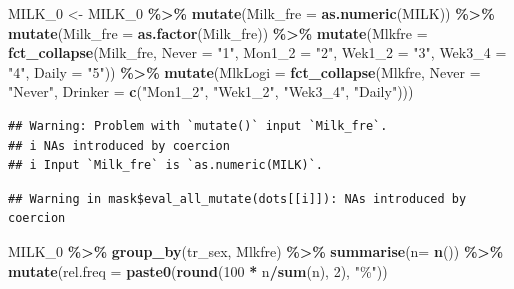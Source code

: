 \documentclass[
]{article}
\newenvironment{Shaded}{\begin{snugshade}}{\end{snugshade}}
\newcommand{\DataTypeTok}[1]{\textcolor[rgb]{0.13,0.29,0.53}{#1}}
\newcommand{\DecValTok}[1]{\textcolor[rgb]{0.00,0.00,0.81}{#1}}
\newcommand{\KeywordTok}[1]{\textcolor[rgb]{0.13,0.29,0.53}{\textbf{#1}}}
\newcommand{\NormalTok}[1]{#1}
\newcommand{\OperatorTok}[1]{\textcolor[rgb]{0.81,0.36,0.00}{\textbf{#1}}}
\newcommand{\StringTok}[1]{\textcolor[rgb]{0.31,0.60,0.02}{#1}}
\begin{document}
\begin{Shaded}
\begin{Highlighting}[]
\NormalTok{MILK\_}\DecValTok{0}\NormalTok{ \textless{}{-}}\StringTok{ }\NormalTok{MILK\_}\DecValTok{0} \OperatorTok{\%\textgreater{}\%}\StringTok{ }
\StringTok{  }\KeywordTok{mutate}\NormalTok{(}\DataTypeTok{Milk\_fre =} \KeywordTok{as.numeric}\NormalTok{(MILK)) }\OperatorTok{\%\textgreater{}\%}\StringTok{ }
\StringTok{  }\KeywordTok{mutate}\NormalTok{(}\DataTypeTok{Milk\_fre =} \KeywordTok{as.factor}\NormalTok{(Milk\_fre)) }\OperatorTok{\%\textgreater{}\%}\StringTok{ }
\StringTok{  }\KeywordTok{mutate}\NormalTok{(}\DataTypeTok{Mlkfre =} \KeywordTok{fct\_collapse}\NormalTok{(Milk\_fre,}
                               \DataTypeTok{Never =} \StringTok{"1"}\NormalTok{,}
                               \DataTypeTok{Mon1\_2 =} \StringTok{"2"}\NormalTok{, }
                               \DataTypeTok{Wek1\_2 =} \StringTok{"3"}\NormalTok{,}
                               \DataTypeTok{Wek3\_4 =} \StringTok{"4"}\NormalTok{,}
                               \DataTypeTok{Daily  =} \StringTok{"5"}\NormalTok{)) }\OperatorTok{\%\textgreater{}\%}\StringTok{ }
\StringTok{  }\KeywordTok{mutate}\NormalTok{(}\DataTypeTok{MlkLogi =} \KeywordTok{fct\_collapse}\NormalTok{(Mlkfre,}
                                \DataTypeTok{Never =} \StringTok{"Never"}\NormalTok{, }
                                \DataTypeTok{Drinker =} \KeywordTok{c}\NormalTok{(}\StringTok{"Mon1\_2"}\NormalTok{, }\StringTok{"Wek1\_2"}\NormalTok{, }\StringTok{"Wek3\_4"}\NormalTok{, }\StringTok{"Daily"}\NormalTok{)))}
\end{Highlighting}
\end{Shaded}

\begin{verbatim}
## Warning: Problem with `mutate()` input `Milk_fre`.
## i NAs introduced by coercion
## i Input `Milk_fre` is `as.numeric(MILK)`.
\end{verbatim}

\begin{verbatim}
## Warning in mask$eval_all_mutate(dots[[i]]): NAs introduced by coercion
\end{verbatim}

\begin{Shaded}
\begin{Highlighting}[]
\NormalTok{MILK\_}\DecValTok{0} \OperatorTok{\%\textgreater{}\%}\StringTok{ }
\StringTok{  }\KeywordTok{group\_by}\NormalTok{(tr\_sex, Mlkfre) }\OperatorTok{\%\textgreater{}\%}
\StringTok{  }\KeywordTok{summarise}\NormalTok{(}\DataTypeTok{n=} \KeywordTok{n}\NormalTok{()) }\OperatorTok{\%\textgreater{}\%}
\StringTok{  }\KeywordTok{mutate}\NormalTok{(}\DataTypeTok{rel.freq =} \KeywordTok{paste0}\NormalTok{(}\KeywordTok{round}\NormalTok{(}\DecValTok{100} \OperatorTok{*}\StringTok{ }\NormalTok{n}\OperatorTok{/}\KeywordTok{sum}\NormalTok{(n), }\DecValTok{2}\NormalTok{), }\StringTok{"\%"}\NormalTok{))}
\end{Highlighting}
\end{Shaded}
\end{document}
